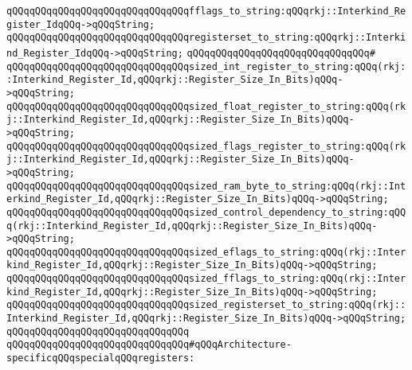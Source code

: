 \newline
\verb|qQQqqQQqqQQqqQQqqQQqqQQqqQQqqQQqfflags_to_string:qQQqrkj::Interkind_Register_IdqQQq->qQQqString;|\newline
\newline
\verb|qQQqqQQqqQQqqQQqqQQqqQQqqQQqqQQqregisterset_to_string:qQQqrkj::Interkind_Register_IdqQQq->qQQqString;|\newline
\newline
\verb|qQQqqQQqqQQqqQQqqQQqqQQqqQQqqQQq#|\newline
\verb|qQQqqQQqqQQqqQQqqQQqqQQqqQQqqQQqsized_int_register_to_string:qQQq(rkj::Interkind_Register_Id,qQQqrkj::Register_Size_In_Bits)qQQq->qQQqString;|\newline
\newline
\verb|qQQqqQQqqQQqqQQqqQQqqQQqqQQqqQQqsized_float_register_to_string:qQQq(rkj::Interkind_Register_Id,qQQqrkj::Register_Size_In_Bits)qQQq->qQQqString;|\newline
\newline
\verb|qQQqqQQqqQQqqQQqqQQqqQQqqQQqqQQqsized_flags_register_to_string:qQQq(rkj::Interkind_Register_Id,qQQqrkj::Register_Size_In_Bits)qQQq->qQQqString;|\newline
\newline
\verb|qQQqqQQqqQQqqQQqqQQqqQQqqQQqqQQqsized_ram_byte_to_string:qQQq(rkj::Interkind_Register_Id,qQQqrkj::Register_Size_In_Bits)qQQq->qQQqString;|\newline
\newline
\verb|qQQqqQQqqQQqqQQqqQQqqQQqqQQqqQQqsized_control_dependency_to_string:qQQq(rkj::Interkind_Register_Id,qQQqrkj::Register_Size_In_Bits)qQQq->qQQqString;|\newline
\newline
\verb|qQQqqQQqqQQqqQQqqQQqqQQqqQQqqQQqsized_eflags_to_string:qQQq(rkj::Interkind_Register_Id,qQQqrkj::Register_Size_In_Bits)qQQq->qQQqString;|\newline
\newline
\verb|qQQqqQQqqQQqqQQqqQQqqQQqqQQqqQQqsized_fflags_to_string:qQQq(rkj::Interkind_Register_Id,qQQqrkj::Register_Size_In_Bits)qQQq->qQQqString;|\newline
\newline
\verb|qQQqqQQqqQQqqQQqqQQqqQQqqQQqqQQqsized_registerset_to_string:qQQq(rkj::Interkind_Register_Id,qQQqrkj::Register_Size_In_Bits)qQQq->qQQqString;|\newline
\newline
\verb|qQQqqQQqqQQqqQQqqQQqqQQqqQQqqQQq|\newline
\verb|qQQqqQQqqQQqqQQqqQQqqQQqqQQqqQQq#qQQqArchitecture-specificqQQqspecialqQQqregisters:|\newline
